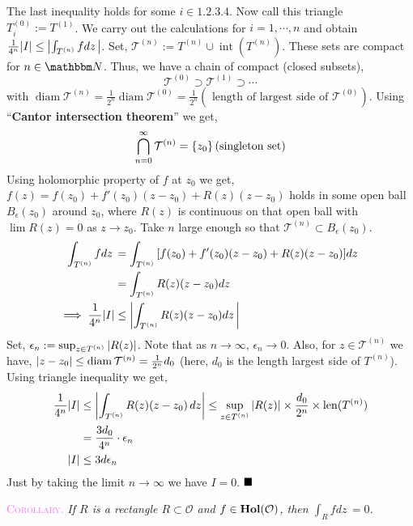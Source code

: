 \documentclass[../ComplexAnalysis_Notes.tex]{subfiles}
\begin{document}
\vspace*{0.2cm}

The last inequality holds for some $i \in \qty{1,2,3,4}$. Now call this triangle $T^{(0)}_i:= T^(1)$. We carry out the calculations for $i =1,\cdots,n$ and obtain $\frac{1}{4^n} \abs{I} \leq \abs{\int_{T^{(n)}} f dz\,}$. Set, $\mathcal{T}^{(n)} := T^{(n)} \cup \operatorname{int} (T^{(n)})$. These sets are compact for $n \in \N$. Thus, we have a chain of compact (closed subsets), $$\mathcal{T}^{(0)} \supset \mathcal{T}^{(1)} \supset \cdots$$
with  $\operatorname{diam} \mathcal{T}^{(n)} = \frac{1}{2^n} \operatorname{diam} \mathcal{T}^{(0)}= \frac{1}{2^n}(\text{ length of largest side of }  \mathcal{T}^{(0)})$. Using ``\textbf{Cantor intersection theorem}'' we get, $$\bigcap_{n=0}^{\infty} \mathcal{T}^{(n)} = \qty{z_0}\, (\text{singleton set})$$
Using holomorphic property of $f$ at $z_0$ we get, $f(z)= f(z_0)+f'(z_0)(z-z_0)+R(z)(z-z_0)$ holds in some open ball $B_{\epsilon}(z_0)$ around $z_0$, where $R(z)$ is continuous on that open ball with $\lim R(z) =0$ as $z \to z_0$. Take $n$ large enough so that $\mathcal{T}^{(n)}\subset B_{\epsilon}(z_0)$.
\begin{align*}
    \int_{T^{(n)}} f dz\, &= \int_{T^{(n)}} \qty[f(z_0)+f'(z_0)(z-z_0) +R(z)(z-z_0)] dz\,\\
    &= \int_{T^{(n)}} R(z)(z-z_0) dz\, \\
    \implies \frac{1}{4^n}\abs{I} &\leq \abs{\int_{T^{(n)}} R(z)(z-z_0) dz\,}
\end{align*}
Set, $\epsilon_n := \sup_{z \in T^{(n)}}\abs{R(z)}$. Note that as $n \to \infty$, $\epsilon_n \to 0$. Also, for $z \in \mathcal{T}^{(n)}$ we have, $\abs{z-z_0} \leq \operatorname{diam} \mathcal{T}^{(n)} = \frac{1}{2^n}d_0$ (here, $d_0$ is the length largest side of $T^{(n)}$). Using triangle inequality we get, \begin{align*}
    \frac{1}{4^n} \abs{I} &\leq  \abs{\int_{T^{(n)}}R(z)(z-z_0)\, dz} \leq \sup_{z \in T^{(n)}} \abs{R(z)} \times \frac{d_0}{2^n} \times \operatorname{len}(T^{(n)})\\
    &= \frac{3d_0}{4^n} \cdot \epsilon_n\\
    \abs{I} &\leq 3d\epsilon_n
\end{align*}
Just by taking the limit $n \to \infty$ we have $I =0$. $\hfill \blacksquare$

\vspace*{0.2cm} %

\hspace*{0.6cm} \textcolor{violet}{\textsc{Corollary}.} \textit{If $R$ is a rectangle $R \subset \mathcal{O}$ and $f \in \operatorname{\mathbf{Hol}} (\mathcal{O})$, then $\int_{R} f dz\,=0$.}
\end{document}
